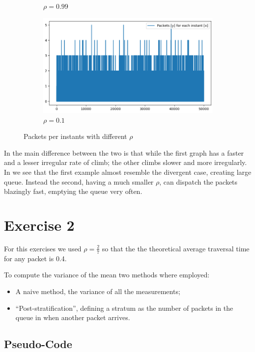 \documentclass[10pt,a4paper]{article}
\begin{document}
\begin{figure}[h]
\begin{subfigure}[t]{.45\textwidth}
    \caption{\(\rho = 0.99\)}
	\label{fig:rho099}
  \end{subfigure}
  \hfill
  \begin{subfigure}[t]{.45\textwidth}
    \centering
	\includegraphics[width=\linewidth]{img/rho0.1}
    \caption{\(\rho = 0.1\)}
	\label{fig:rho010}
  \end{subfigure}
  \caption{Packets per instants with different \(\rho\)}
\end{figure}
  

In  the main difference between the two is that while the first graph has a faster and a lesser irregular rate of climb; the other climbs slower and more irregularly. In   we see that the first example almost resemble the divergent case, creating large queue. Instead the second, having a much smaller \(\rho\), can dispatch the packets blazingly fast, emptying the queue very often.

\section*{Exercise 2}

For this exercises we used \(\rho = \frac{2}{7}\) so that the the theoretical average traversal time for any packet is 0.4.

To compute the variance of the mean two methods where employed:
\begin{itemize}
\item A naive method, the variance of all the measurements;
\item ``Post-stratification'', defining a stratum as the number of packets in the queue in when another packet arrives.
\end{itemize}

\subsection*{Pseudo-Code}
\end{document}
